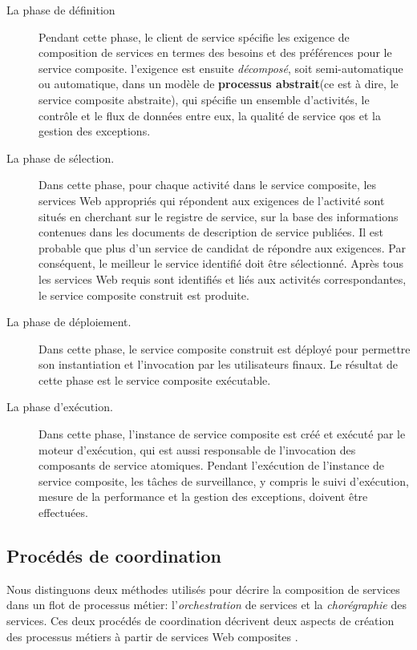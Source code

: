   

  \renewcommand{\descriptionlabel}[1]{\hspace{0.5cm}\textbullet~\textsf{#1}}
  \begin{description}
  \item[La phase de définition] Pendant cette phase, le client de
    service spécifie les exigence de composition de services en termes
    des besoins et des préférences pour le service
    composite. l'exigence est ensuite \textit{décomposé}, soit
    semi-automatique ou automatique, dans un modèle de
    \textbf{processus abstrait}(ce est à dire, le service composite
    abstraite), qui spécifie un ensemble d'activités, le contrôle et
    le flux de données entre eux, la qualité de service \acrshort{qos}
    et la gestion des exceptions.

  \item[La phase de sélection.] Dans cette phase, pour chaque activité
    dans le service composite, les services Web appropriés qui
    répondent aux exigences de l'activité sont situés en cherchant sur
    le registre de service, sur la base des informations contenues
    dans les documents de description de service publiées. Il est
    probable que plus d'un service de candidat de répondre aux
    exigences. Par conséquent, le meilleur le service identifié doit
    être sélectionné. Après tous les services Web requis sont
    identifiés et liés aux activités correspondantes, le service
    composite construit est produite.

  \item[La phase de déploiement.]Dans cette phase, le service
    composite construit est déployé pour permettre son instantiation
    et l'invocation par les utilisateurs finaux. Le résultat de cette
    phase est le service composite exécutable.

  \item[La phase d'exécution.] Dans cette phase, l'instance de service
    composite est créé et exécuté par le moteur d'exécution, qui est
    aussi responsable de l'invocation des composants de service
    atomiques. Pendant l'exécution de l'instance de service composite,
    les tâches de surveillance, y compris le suivi d'exécution, mesure
    de la performance et la gestion des exceptions, doivent être
    effectuées.
  \end{description}
  \enddescription

  \subsection{Procédés de coordination}
  \label{sec:proc-de-coord}
  Nous distinguons deux méthodes utilisés pour décrire la composition
  de services dans un flot de processus métier: l'\emph{orchestration}
  de services et la \emph{chorégraphie} des services. Ces deux
  procédés de coordination décrivent deux aspects de création des
  processus métiers à partir de services Web composites
  \cite{peltz2003web}.\medskip

